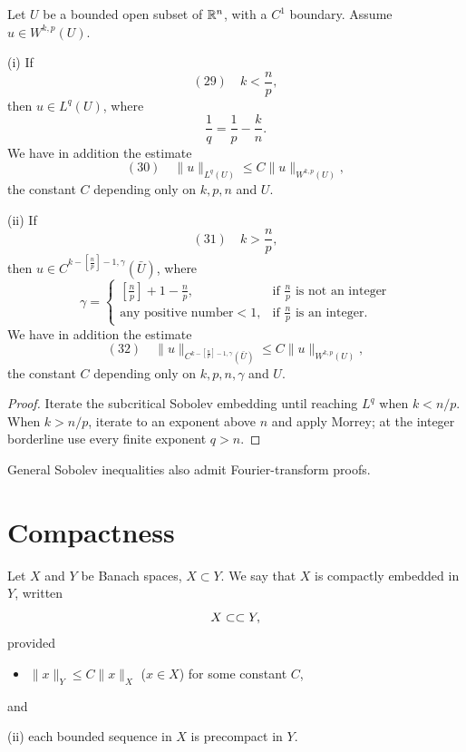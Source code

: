 \begin{theorem}
\label{thm:general-sobolev-inequalities}

Let $U$ be a bounded open subset of $\mathbb{R}^n$, with a $C^1$ boundary. Assume $u \in W^{k,p}(U)$.

(i) If
$$(29) \quad k < \frac{n}{p},$$
then $u \in L^q(U)$, where
$$\frac{1}{q} = \frac{1}{p} - \frac{k}{n}.$$
We have in addition the estimate
$$(30) \quad \|u\|_{L^q(U)} \le C\|u\|_{W^{k,p}(U)},$$
the constant $C$ depending only on $k, p, n$ and $U$.

(ii) If
$$(31) \quad k > \frac{n}{p},$$
then $u \in C^{k-[\frac{n}{p}]-1,\gamma}(\bar{U})$, where
$$\gamma = \begin{cases}
\left[\frac{n}{p}\right] + 1 - \frac{n}{p}, & \text{if } \frac{n}{p} \text{ is not an integer} \\
\text{any positive number} < 1, & \text{if } \frac{n}{p} \text{ is an integer}.
\end{cases}$$
We have in addition the estimate
$$(32) \quad \|u\|_{C^{k-[\frac{n}{p}]-1,\gamma}(\bar{U})} \le C\|u\|_{W^{k,p}(U)},$$
the constant $C$ depending only on $k, p, n, \gamma$ and $U$.
\end{theorem}

\begin{proof}
\sketch Iterate the subcritical Sobolev embedding until reaching $L^q$ when $k<n/p$. When $k>n/p$, iterate to an exponent above $n$ and apply Morrey; at the integer borderline use every finite exponent $q>n$.
\end{proof}

\begin{remark}
\label{rem:general-sobolev-fourier-remark}

General Sobolev inequalities also admit Fourier-transform proofs.
\end{remark}

\section{Compactness}
\label{sec:sobolev-compactness}

\begin{definition}
\label{def:compact-embedding}
Let $X$ and $Y$ be Banach spaces, $X \subset Y$. We say that $X$ is compactly embedded in $Y$, written
$$X \subset\subset Y,$$
provided
\begin{itemize}
\item[(i)] $\|x\|_Y \le C\|x\|_X$ ($x \in X$) for some constant $C$,
\end{itemize}
and

(ii) each bounded sequence in $X$ is precompact in $Y$.
\end{definition}

